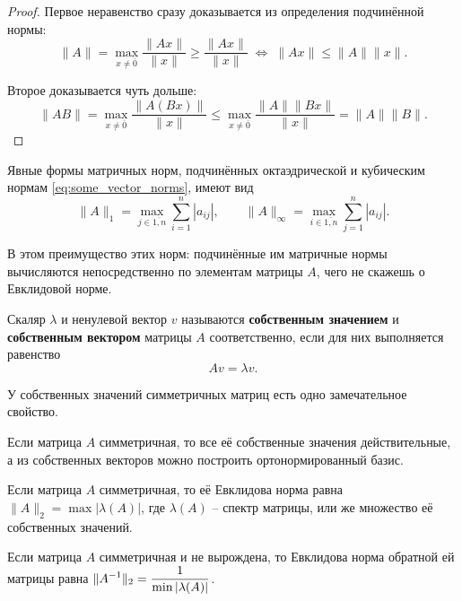 \documentclass{article}
\begin{document}
\begin{proof}
	Первое неравенство сразу доказывается из определения подчинённой нормы:
	\[\|A\|=\max_{x\ne\overline{0}}\frac{\|Ax\|}{\|x\|}\ge
	\frac{\|Ax\|}{\|x\|}\;\Leftrightarrow\;
	\|Ax\|\le\|A\|\|x\|.\]

	Второе доказывается чуть дольше:
	\[\|AB\|=\max_{x\ne\overline{0}}\frac{\|A(Bx)\|}{\|x\|}\le
	\max_{x\ne\overline{0}}\frac{\|A\|\|Bx\|}{\|x\|}=\|A\|\|B\|.\]
\end{proof}

\begin{lemma}
	Явные формы матричных норм, подчинённых октаэдрической и кубическим
	нормам \eqref{eq:some_vector_norms}, имеют вид
	\[\|A\|_1=\max_{j\in\overline{1,n}}\sum_{i=1}^{n}|a_{ij}|,\qquad
	\|A\|_\infty=\max_{i\in\overline{1,n}}\sum_{j=1}^{n}|a_{ij}|.\]
\end{lemma}

\proofexercise

В этом преимущество этих норм: подчинённые им матричные нормы вычисляются
непосредственно по элементам матрицы $A$, чего не скажешь о Евклидовой норме.

\begin{define}
	Скаляр $\lambda$ и ненулевой вектор $v$ называются \textbf{собственным
	значением} и \textbf{собственным вектором} матрицы $A$ соответственно,
	если для них выполняется равенство
	\[Av=\lambda v.\]
\end{define}

У собственных значений симметричных матриц есть одно замечательное свойство.
\begin{lemma}\label{eq:symmetric_matrix_props}
	Если матрица $A$ симметричная, то все её собственные значения
	действительные, а из собственных векторов можно построить
	ортонормированный базис.
\end{lemma}

\begin{theorem}
\label{eq:symmetric_matrix_norm}
	Если матрица $A$ симметричная, то её Евклидова норма равна $\|A\|_2=
	\max|\lambda(A)|$, где $\lambda(A)$ -- спектр матрицы, или же множество
	её собственных значений.
\end{theorem}

\begin{corollary}
	Если матрица $A$ симметричная и не вырождена, то Евклидова норма
	обратной ей матрицы равна
	$\mathlarger{\|A^{-1}\|_2=\frac{1}{\min|\lambda(A)|}}$.
\end{corollary}
\end{document}
